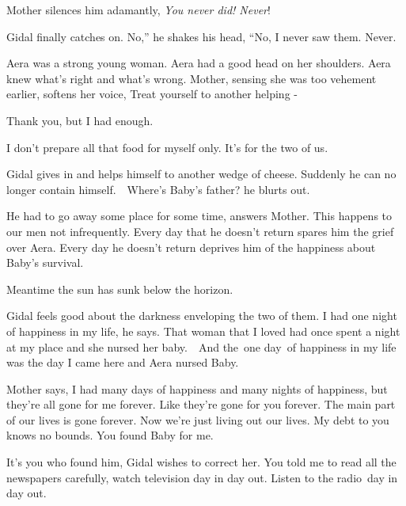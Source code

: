 \documentclass[letterpaper]{article}
\begin{document}
Mother silences him adamantly, {\textquotedbl}\textit{You never did! Never}!{\textquotedbl} 

Gidal finally catches on. {\textquotedbl}No,'' he shakes his head, ``No, I never saw them. Never.{\textquotedbl} 

{\textquotedbl}Aera was a strong young woman. Aera had a good head on her shoulders. Aera knew what's right and what's
wrong.{\textquotedbl} Mother, sensing she was too vehement earlier, softens her voice, {\textquotedbl}Treat yourself to
another helping -{\textquotedbl} 

{\textquotedbl}Thank you, but I had enough.{\textquotedbl}\ 

{\textquotedbl}I don't prepare all that food for myself only. It's for the two of us.{\textquotedbl}

Gidal gives in and helps himself to another wedge of cheese. Suddenly he can no longer contain
himself.\ \ {\textquotedbl}Where's Baby's father?{\textquotedbl} he blurts out.

{\textquotedbl}He had to go away some place for some time,{\textquotedbl} answers Mother. {\textquotedbl}This happens to
our men not infrequently. Every day that he doesn't return spares him the grief over Aera. Every day he doesn't return
deprives him of the happiness about Baby's survival.{\textquotedbl}\ 

Meantime the sun has sunk below the horizon. 

Gidal feels good about the darkness enveloping the two of them. {\textquotedbl}I had one night of happiness in my
life,{\textquotedbl} he says. {\textquotedbl}That woman that I loved had once spent a night at my place and she nursed
her baby.\ \ And the\textcolor[rgb]{0.0,0.4392157,0.7529412}{\ }one day\textit{\ }of happiness in my life was the day I
came here and Aera nursed Baby.{\textquotedbl} 

Mother says, {\textquotedbl}I had many days of happiness and many nights of happiness, but they're all gone for me
forever. Like they're gone for you forever. The main part of our lives is gone forever. Now we're just living out our
lives. My debt to you knows no bounds. You found Baby for me.{\textquotedbl} 

{\textquotedbl}It's you who found him,{\textquotedbl} Gidal wishes to correct her. {\textquotedbl}You told me to read
all the newspapers carefully, watch television day in day out. Listen to the radio\textcolor{red}{\ }day in day
out.{\textquotedbl}

~
\end{document}
